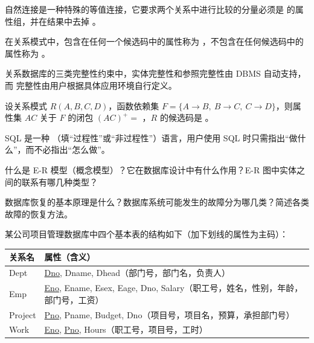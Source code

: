 \documentclass[a4paper,11pt]{article}
\begin{document}

\q 自然连接是一种特殊的等值连接，它要求两个关系中进行比较的分量必须是 \fillblank{} 的属性组，并在结果中去掉 \fillblank{}。

\q 在关系模式中，包含在任何一个候选码中的属性称为 \fillblank{}，不包含在任何候选码中的属性称为 \fillblank{}。

\q 关系数据库的三类完整性约束中，实体完整性和参照完整性由 DBMS 自动支持，而 \fillblank{} 完整性由用户根据具体应用环境自行定义。

\q 设关系模式 $R(A,B,C,D)$，函数依赖集 $F=\{A\to B,\ B\to C,\ C\to D\}$，则属性集 $AC$ 关于 $F$ 的闭包 $(AC)^{+}=$ \fillblank{}，$R$ 的候选码是 \fillblank{}。

\q SQL 是一种 \fillblank{}（填“过程性”或“非过程性”）语言，用户使用 SQL 时只需指出“做什么”，而不必指出“怎么做”。


\q 什么是 E-R 模型（概念模型）？它在数据库设计中有什么作用？E-R 图中实体之间的联系有哪几种类型？
\anslines{3.2cm}

\q 数据库恢复的基本原理是什么？数据库系统可能发生的故障分为哪几类？简述各类故障的恢复方法。
\anslines{3.2cm}


\q 某公司项目管理数据库中四个基本表的结构如下（加下划线的属性为主码）：

\begin{center}
\begin{tabular}{ll}
\toprule
关系名 & 属性（含义） \\
\midrule
Dept & \underline{Dno}, Dname, Dhead（部门号，部门名，负责人） \\
Emp & \underline{Eno}, Ename, Esex, Eage, Dno, Salary（职工号，姓名，性别，年龄，部门号，工资） \\
Project & \underline{Pno}, Pname, Budget, Dno（项目号，项目名，预算，承担部门号） \\
Work & \underline{Eno}, \underline{Pno}, Hours（职工号，项目号，工时） \\
\bottomrule
\end{tabular}
\end{center}
\end{document}
